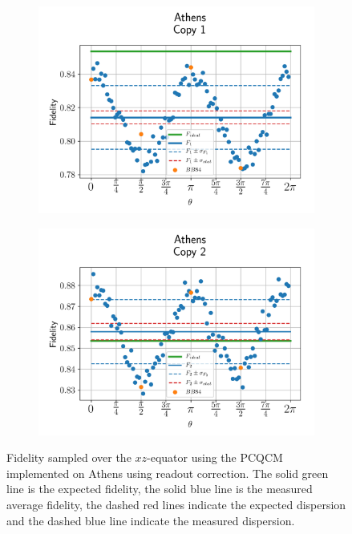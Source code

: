 \begin{figure}[H]
  \centering
  \begin{subfigure}{.5\textwidth}
    \centering
    \includegraphics[width=\textwidth]{Figures/PhaseCovariant/IBM/OnlyEquator/results_corrected_athens_copy1.png}
    \label{fig:pc_corrected_athens_equator_1}
  \end{subfigure}%
  \begin{subfigure}{.5\textwidth}
    \centering
    \includegraphics[width=\textwidth]{Figures/PhaseCovariant/IBM/OnlyEquator/results_corrected_athens_copy2.png}
    \label{fig:pc_corrected_athens_equator_2}
  \end{subfigure}
  \vspace{-0.5cm}
  \caption{Fidelity sampled over the $xz$-equator using the PCQCM implemented on Athens using readout correction. The solid green line is the expected fidelity, the solid blue line is the measured average fidelity, the dashed red lines indicate the expected dispersion and the dashed blue line indicate the measured dispersion.}
  \label{fig:pc_corrected_athens_equator}
\end{figure}


